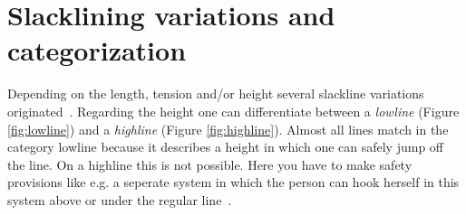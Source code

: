 \section{Slacklining variations and categorization}\label{3_2_slacklineVariations}
Depending on the length, tension and/or height several slackline variations originated~\cite{MillerMauser2013-sl, Kleindl2011-bl, Thomann2017-ab}. Regarding the height one can differentiate between a \textit{lowline} (Figure \ref{fig:lowline}) and a \textit{highline} (Figure \ref{fig:highline}). Almost all lines match in the category lowline because it describes a height in which one can safely jump off the line. On a highline this is not possible. Here you have to make safety provisions like e.g. a seperate system in which the person can hook herself in this system above or under the regular line~\cite{Kleindl2011-bl}.
